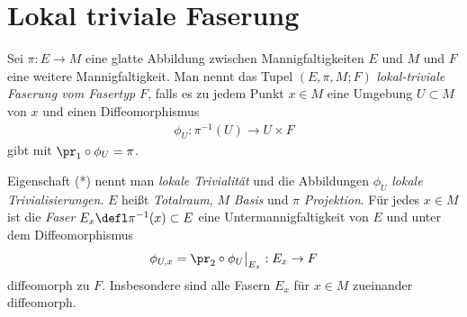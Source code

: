 \documentclass[%
	paper=a5,%
	fleqn,%
	DIV=18,%
	BCOR=0mm,
	fontsize=11pt,
	titlepage=false,%
	bibliography=totoc,
	DIV=18,%
	twoside=true,
	pdftitle=Riemannsche Geometrie,
	pdfauthor=Uwe Semmelmann,
	numbers=noendperiod]%
	{scrbook}
\begin{document}
\section{Lokal triviale Faserung}

\begin{defn}
Sei $\pi: E\to M$ eine glatte Abbildung zwischen Mannigfaltigkeiten $E$ und $M$
und $F$ eine weitere Mannigfaltigkeit. Man nennt das Tupel $(E,\pi,M;F)$
\emph{lokal-triviale Faserung vom Fasertyp $F$}, falls es zu jedem Punkt $x\in
M$ eine Umgebung $U\subset M$ von $x$ und einen Diffeomorphismus
\begin{align*}
\phi_U : \pi^{-1}(U)\to U\times F\tag{*}
\end{align*}
gibt mit $\pr_1\circ\phi_U = \pi$.\fish
\end{defn}


Eigenschaft (*) nennt man \emph{lokale Trivialität} und die Abbildungen
$\phi_U$ \emph{lokale Trivialisierungen}. $E$ heißt \emph{Totalraum}, $M$
\emph{Basis} und $\pi$ \emph{Projektion}.
Für jedes $x\in M$ ist die \emph{Faser} $E_x \defl \pi^{-1}(x) \subset E$
eine Untermannigfaltigkeit von $E$ und unter dem Diffeomorphismus
\begin{align*}
\phi_{U,x} = \pr_2\circ\phi_U\big|_{E_x} : E_x\to F
\end{align*}
diffeomorph zu $F$. Insbesondere sind alle Fasern $E_x$ für $x\in M$ zueinander
diffeomorph.
\end{document}
